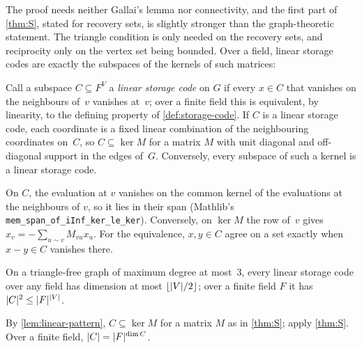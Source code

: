 The proof needs neither Gallai's lemma nor connectivity, and the first part of \cref{thm:S}, stated for recovery sets, is slightly stronger
than the graph-theoretic statement. The triangle condition is only needed on the recovery sets, and reciprocity only on the vertex
set being bounded. Over a field, linear storage codes are exactly the subspaces of the kernels of such matrices:

\begin{lemma}\label{lem:linear-pattern}
Call a subspace $C\subseteq F^V$ a \emph{linear storage code} on $G$ if every $x\in C$ that vanishes on the neighbours
of~$v$ vanishes at~$v$; over a finite field this is equivalent, by linearity, to the defining property of
\cref{def:storage-code}. If $C$ is a linear storage code, each coordinate is a fixed linear combination of the
neighbouring coordinates on~$C$, so $C\subseteq\ker M$ for a matrix $M$ with unit diagonal and off-diagonal support in the
edges of~$G$. Conversely, every subspace of such a kernel is a linear storage code.
\end{lemma}

\begin{outline}
On $C$, the evaluation at $v$ vanishes on the common kernel of the evaluations at the neighbours of $v$, so it lies in
their span (Mathlib's \texttt{mem\_span\_of\_iInf\_ker\_le\_ker}). Conversely, on $\ker M$ the row of~$v$ gives
$x_v=-\sum_{u\sim v}M_{vu}x_u$. For the equivalence, $x,y\in C$ agree on a set exactly when $x-y\in C$ vanishes there.
\end{outline}

\begin{corollary}\label{cor:S-linear}
On a triangle-free graph of maximum degree at most~$3$, every linear storage code over any field has dimension at most
$\lfloor\lvert V \rvert/2\rfloor$; over a finite field $F$ it has $\lvert C \rvert^2\le\lvert F \rvert^{\lvert V \rvert}$.
\end{corollary}

\begin{outline}
By \cref{lem:linear-pattern}, $C\subseteq\ker M$ for a matrix $M$ as in \cref{thm:S}; apply \cref{thm:S}. Over a finite
field, $\lvert C \rvert=\lvert F \rvert^{\dim C}$.
\end{outline}

